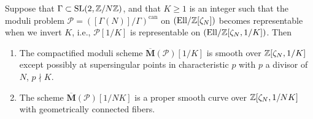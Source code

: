 \begin{kcor}\label{cor:10.9.2}
Suppose that $\Gamma \subset \operatorname{SL}(2,\mathbb{Z}/N\mathbb{Z})$, and that $K \ge 1$ is an integer such that the moduli problem $\mathcal{P} = ([\Gamma(N)]/\Gamma)^{\mathrm{can}}$ on $(\mathrm{Ell}/\mathbb{Z}[\zeta_N])$ becomes representable when we invert $K$, i.e., $\mathcal{P}[1/K]$ is representable on $(\mathrm{Ell}/\mathbb{Z}[\zeta_N, 1/K])$. Then
\begin{enumerate}[label=(\arabic*)]
\item The compactified moduli scheme $\overline{\mathbf{M}}(\mathcal{P})[1/K]$ is smooth over $\mathbb{Z}[\zeta_N, 1/K]$ except possibly at supersingular points in characteristic $p$ with $p$ a divisor of $N$, $p \nmid K$.
\item The scheme $\overline{\mathbf{M}}(\mathcal{P})[1/NK]$ is a proper smooth curve over $\mathbb{Z}[\zeta_N, 1/NK]$ with geometrically connected fibers.
\end{enumerate}
\end{kcor}

